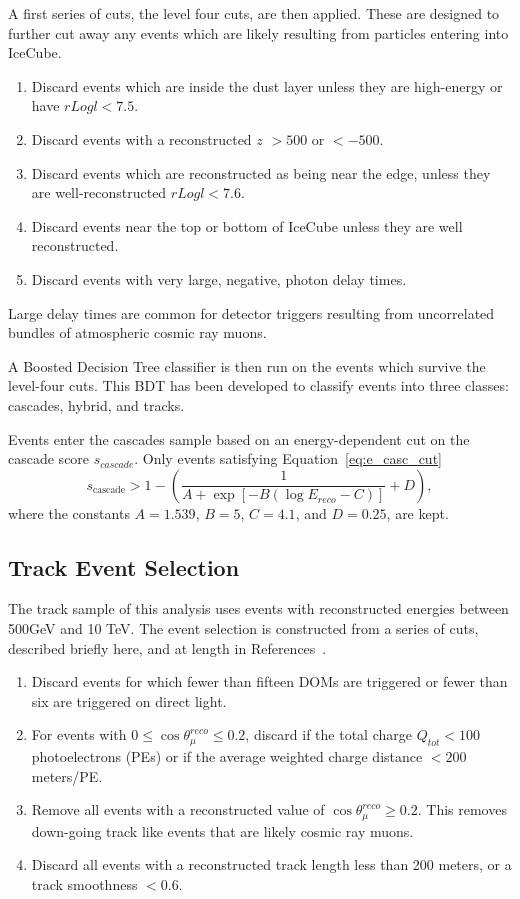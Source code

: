 \documentclass[main.tex]{subfiles}
\begin{document}
A first series of cuts, the level four cuts, are then applied. 
These are designed to further cut away any events which are likely resulting from particles entering into IceCube. 
\begin{enumerate}
    \item Discard events which are inside the dust layer unless they are high-energy or have $rLogl<7.5$. 
    \item Discard events with a reconstructed $z$ $>500$ or $<-500$. 
    \item Discard events which are reconstructed as being near the edge, unless they are well-reconstructed $rLogl<7.6$.
    \item Discard events near the top or bottom of IceCube unless they are well reconstructed. 
    \item Discard events with very large, negative, photon delay times. 
\end{enumerate}
Large delay times are common for detector triggers resulting from uncorrelated bundles of atmospheric cosmic ray muons. 

A Boosted Decision Tree classifier is then run on the events which survive the level-four cuts. 
This BDT has been developed to classify events into three classes: cascades, hybrid, and tracks.

Events enter the cascades sample based on an energy-dependent cut on the cascade score $s_{cascade}$. Only events satisfying Equation~\eqref{eq:e_casc_cut}
\begin{equation}
    s_{\text{cascade}} > 1 - \left(\dfrac{1}{A + \exp\left[ -B(\log E_{reco} - C) \right]} + D\right),
\end{equation}\label{eq:e_casc_cut}
where the constants $A=1.539$, $B=5$, $C=4.1$, and $D=0.25$, are kept. 

\subsection{Track Event Selection}

The track sample of this analysis uses events with reconstructed energies between 500GeV and 10 TeV. 
The event selection is constructed from a series of cuts, described briefly here, and at length in References~\cite{Aartsen_2020, Aartsen_2020_prd, axani2020sterile}. %

\begin{enumerate}
    \item Discard events for which fewer than fifteen DOMs are triggered or fewer than six are triggered on direct light.
    \item  For events with $0\leq\cos\theta_{\mu}^{reco}\leq 0.2$, discard if the total charge $Q_{tot}<100$ photoelectrons (PEs) or if the average weighted charge distance $<200$ meters/PE. 
    \item Remove all events with a reconstructed value of $\cos\theta_{\mu}^{reco}\geq 0.2$. This removes down-going track like events that are likely cosmic ray muons. 
    \item Discard all events with a reconstructed track length less than 200 meters, or a track smoothness $<0.6$.
\end{enumerate}
\end{document}
